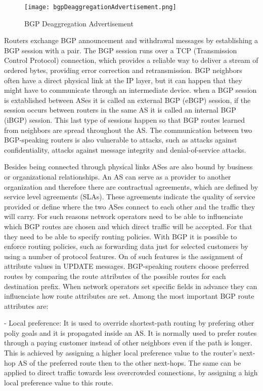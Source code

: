\documentclass[11pt]{report}
\begin{document}
\begin{figure}[h!]
\centering
\texttt{[image: bgpDeaggregationAdvertisement.png]}
\caption{BGP Deaggregation Advertisement}
\label{fig:bgpDeaggregationAdvertisement}
\end{figure}


Routers exchange BGP announcement and withdrawal messages by establishing a BGP session with a pair. The BGP session runs over a TCP (Transmission Control Protocol) connection, which provides a reliable way to deliver a stream of ordered bytes, providing error correction and retransmission. BGP neighbors often have a direct physical link at the IP layer, but it can happen that they might have to communicate through an intermediate device. when a BGP session is extablished between ASes it is called an external BGP (eBGP) session, if the session occurs between routers in the same AS it is called an internal BGP (iBGP) session. This last type of sessions happen so that BGP routes learned from neighbors are spread throughout the AS. The communication between two BGP-speaking routers is also vulnerable to attacks, such as attacks against confidentiality, attacks against message integrity and denial-of-service attacks.

Besides being connected through physical links ASes are also bound by business or organizational relationships. An AS can serve as a provider to another organization and therefore there are contractual agreements, which are defined by service level agreements (SLAs). These agreements indicate the quality of service provided or define where the two ASes connect to each other and the traffic they will carry. For such reasons network operators need to be able to influenciate which BGP routes are chosen and which direct traffic will be accepted. For that they need to be able to specify routing policies. With BGP it is possible to enforce routing policies, such as forwarding data just for selected customers by using a number of protocol features. On of such features is the assignment of attribute values in UPDATE messages. BGP-speaking routers choose preferred routes by comparing the route attributes of the possible routes for each destination prefix. When network operators set specific fields in advance they can influenciate how route attributes are set. Among the most important BGP route attributes are:

- Local preference: It is used to override shortest-path routing by prefering other poliy goals and it is propagated inside an AS. It is normally used to prefer routes through a paying customer instead of other neighbors even if the path is longer. This is achieved by assigning a higher local preference value to the router's next-hop AS of the preferred route then to the other next-hops. The same can be applied to direct traffic towards less overcrowded connections, by assigning a high local preference value to this route. 
\end{document}
